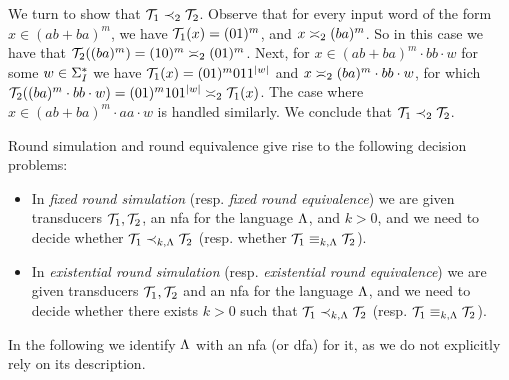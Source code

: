 \begin{example}
We turn to show that $\cT_1\prec_{2}\cT_2$.  Observe that for every input word of the form $x\in (ab+ba)^m$, we have $\cT_1(x)=(01)^m$, and $x\req[2] (ba)^m$. So in this case we have that $\cT_2((ba)^m)=(10)^m\req[2] (01)^m$. Next, for $x\in (ab+ba)^m\cdot bb\cdot w$ for some $w\in \sI^*$ we have $\cT_1(x)=(01)^m 01 1^{|w|}$ and $x\req[2] (ba)^m\cdot bb\cdot w$, for which $\cT_2((ba)^m\cdot bb\cdot w)=(01)^m 10 1^{|w|}\req[2]\cT_1(x)$.
The case where $x\in (ab+ba)^m\cdot aa\cdot w$ is handled similarly. We conclude that $\cT_1\prec_{2} \cT_2$.
\end{example}

Round simulation and round equivalence give rise to the following decision problems: 
\begin{itemize}
	\item In \emph{fixed round simulation} (resp. \emph{fixed round equivalence}) we are given transducers $\cT_1,\cT_2$, an \gls{nfa} for the language $\fL$, and $k>0$, and we need to decide whether $\cT_1\prec_{k,\fL} \cT_2$ (resp. whether $\cT_1\equiv_{k,\fL}\cT_2$).
	\item In \emph{existential round simulation} (resp. \emph{existential round equivalence}) we are given transducers $\cT_1,\cT_2$ and an \gls{nfa} for the language $\fL$, and we need to decide whether there exists $k>0$ such that $\cT_1\prec_{k,\fL} \cT_2$ (resp. $\cT_1\equiv_{k,\fL}\cT_2$). 
\end{itemize}
In the following we identify $\fL$ with an \gls{nfa} (or \gls{dfa}) for it, as we do not explicitly rely on its description.

